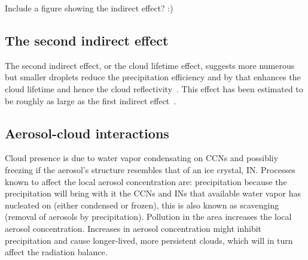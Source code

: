 Include a figure showing the indirect effect? :)

\subsection{The second indirect effect}
The second indirect effect, or the cloud lifetime effect, suggests more numerous but smaller droplets reduce the precipitation efficiency and by that enhances the cloud lifetime and hence the cloud reflectivity~\citep{Albrecht1989}. This effect has been estimated to be roughly as large as the first indirect effect~\citep{Lohmann2005}.

\subsection{Aerosol-cloud interactions}
Cloud presence is due to water vapor condensating on CCNs and possibliy freezing if the aerosol's structure resembles that of an ice crystal, IN. Processes known to affect the local aerosol concentration are: precipitation because the precipitation will bring with it the CCNs and INs that available water vapor has nucleated on (either condensed or frozen), this is also known as scavenging (removal of aerosols by precipitation). Pollution in the area increases the local aerosol concentration. Increases in aerosol concentration might inhibit precipitation and cause longer-lived, more persistent clouds, which will in turn affect the radiation balance.